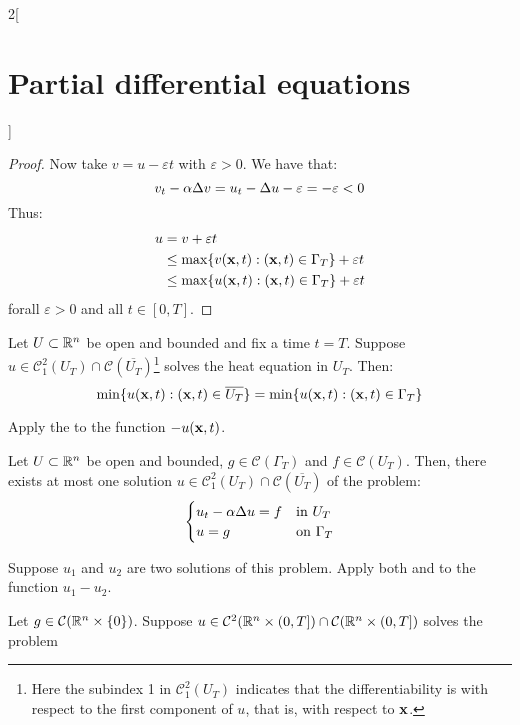 \documentclass[../../../main_math.tex]{subfiles}
\begin{document}
\begin{multicols}{2}[\section{Partial differential equations}]
\begin{proof}
    Now take $v=u-\varepsilon t$ with $\varepsilon>0$. We have that: $$v_t-\alpha \Delta v=u_t-\Delta u -\varepsilon = -\varepsilon <0$$
    Thus:
    \begin{align*}
      u & =v+\varepsilon t                                              \\
        & \leq \max\{v(\boldsymbol{\mathrm{x}},t):(\boldsymbol{\mathrm{x}},t)\in\Gamma_T\} +\varepsilon t \\
        & \leq \max\{u(\boldsymbol{\mathrm{x}},t):(\boldsymbol{\mathrm{x}},t)\in\Gamma_T\} +\varepsilon t
    \end{align*}
    forall $\varepsilon >0$ and all $t\in[0,T]$.
  \end{proof}
  \begin{theorem}\label{PDE:min}
    Let $U\subset\mathbb{R}^n$ be open and bounded and fix a time $t=T$. Suppose $u\in\mathcal{C}_1^2(U_T)\cap\mathcal{C}(\overline{U_T})$\footnote{Here the subindex 1 in $\mathcal{C}_1^2(U_T)$ indicates that the differentiability is with respect to the first component of $u$, that is, with respect to $\boldsymbol{\mathrm{x}}$.} solves the heat equation in $U_T$. Then:
    $$\min\{u(\boldsymbol{\mathrm{x}},t):(\boldsymbol{\mathrm{x}},t)\in\overline{U_T}\}=\min\{u(\boldsymbol{\mathrm{x}},t):(\boldsymbol{\mathrm{x}},t)\in\Gamma_T\}$$
  \end{theorem}
  \begin{sproof}
    Apply the  to the function $-u(\boldsymbol{\mathrm{x}},t)$.
  \end{sproof}
  \begin{theorem}
    Let $U\subset\mathbb{R}^n$ be open and bounded, $g\in\mathcal{C}(\Gamma_T)$ and $f\in\mathcal{C}(U_T)$. Then, there exists at most one solution $u\in\mathcal{C}_1^2(U_T)\cap\mathcal{C}(\overline{U_T})$ of the problem:
    $$
      \begin{cases}
        u_{t}  -\alpha\Delta{u} = f & \text{in $U_T$}      \\
        u=g                             & \text{on $\Gamma_T$}
      \end{cases}
    $$
  \end{theorem}
  \begin{sproof}
    Suppose $u_1$ and $u_2$ are two solutions of this problem. Apply both  and  to the function $u_1-u_2$.
  \end{sproof}
  \begin{theorem}\label{PDE:Cauchymax}
    Let $g\in\mathcal{C}(\mathbb{R}^n\times \{0\})$. Suppose $u\in\mathcal{C}^2(\mathbb{R}^n\times (0,T])\cap\mathcal{C}(\mathbb{R}^n\times (0,T])$ solves the problem

\end{theorem}
\end{multicols}
\end{document}
